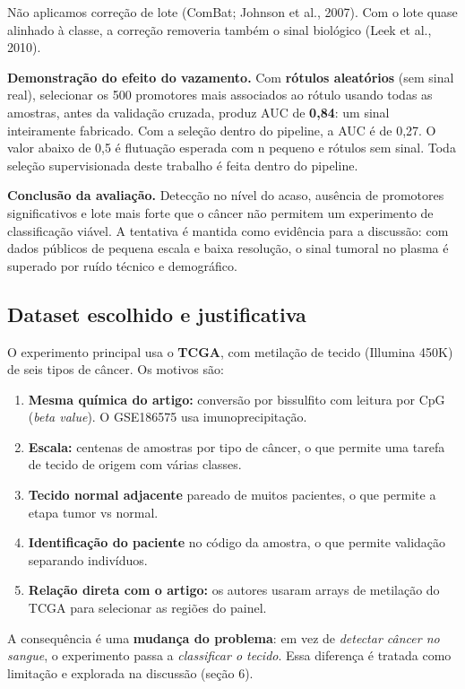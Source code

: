 \documentclass[11pt,a4paper]{article}
\providecommand{\tightlist}{\setlength{\itemsep}{0pt}\setlength{\parskip}{0pt}}
\begin{document}
Não aplicamos correção de lote (ComBat; Johnson et al., 2007). Com o lote quase
alinhado à classe, a correção removeria também o sinal biológico (Leek et al.,
2010).

\textbf{Demonstração do efeito do vazamento.} Com \textbf{rótulos aleatórios}
(sem sinal real), selecionar os 500 promotores mais associados ao rótulo usando
todas as amostras, antes da validação cruzada, produz AUC de \textbf{0,84}: um
sinal inteiramente fabricado. Com a seleção dentro do pipeline, a AUC é de 0,27.
O valor abaixo de 0,5 é flutuação esperada com n pequeno e rótulos sem sinal.
Toda seleção supervisionada deste trabalho é feita dentro do pipeline.

\textbf{Conclusão da avaliação.} Detecção no nível do acaso, ausência de
promotores significativos e lote mais forte que o câncer não permitem um
experimento de classificação viável. A tentativa é mantida como evidência para a
discussão: com dados públicos de pequena escala e baixa resolução, o sinal
tumoral no plasma é superado por ruído técnico e demográfico.

\subsection{Dataset escolhido e justificativa}

O experimento principal usa o \textbf{TCGA}, com metilação de tecido (Illumina
450K) de seis tipos de câncer. Os motivos são:

\begin{enumerate}
\def\labelenumi{\arabic{enumi}.}
\tightlist
\item
  \textbf{Mesma química do artigo:} conversão por bissulfito com leitura por CpG
  (\emph{beta value}). O GSE186575 usa imunoprecipitação.
\item
  \textbf{Escala:} centenas de amostras por tipo de câncer, o que permite uma
  tarefa de tecido de origem com várias classes.
\item
  \textbf{Tecido normal adjacente} pareado de muitos pacientes, o que permite a
  etapa tumor vs normal.
\item
  \textbf{Identificação do paciente} no código da amostra, o que permite
  validação separando indivíduos.
\item
  \textbf{Relação direta com o artigo:} os autores usaram arrays de metilação do
  TCGA para selecionar as regiões do painel.
\end{enumerate}

A consequência é uma \textbf{mudança do problema}: em vez de \emph{detectar
câncer no sangue}, o experimento passa a \emph{classificar o tecido}. Essa
diferença é tratada como limitação e explorada na discussão (seção 6).
\end{document}
